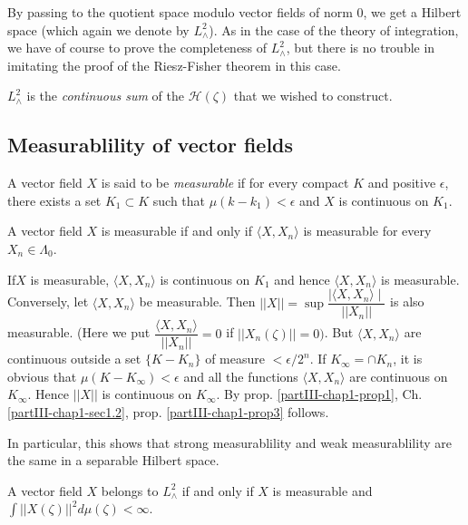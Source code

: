 By passing to the quotient space modulo vector fields of norm $0$, we
get a Hilbert space (which again we denote by $L^2_\wedge$). As in the
case of the  theory of integration, we have of course to prove the
completeness of $L^2_\wedge$, but there is no trouble in imitating the
proof of the Riesz-Fisher theorem in this case. 

$L^2_\wedge$ is the \textit{continuous sum} of the
$\mathscr{H}(\zeta)$ that we wished to construct. 

\subsection{Measurablility of vector
fields}\label{partIII-chap1-sec1.4} %

\begin{defi*}
A vector field $X$ is said to be {\em measurable} if for every compact
$K$ and positive $\epsilon$, there exists a set $K_1 \subset K$  such
that $\mu(k-k_1)< \epsilon$ and $X$ is continuous on $K_1$. 
\end{defi*} 

\begin{proposition}\label{partIII-chap1-prop3}%
A vector field $X$ is measurable if and only if $\langle X,X_n
  \rangle$ is measurable for every $X_n\in\Lambda_0$. 
\end{proposition}
 
If\pageoriginale $X$ is measurable, $\langle X,X_n \rangle $ is
 continuous on $K_1$ 
 and hence $\langle X,X_n\rangle$ is measurable. Conversely, let
 $\langle X,X_n\rangle $ be measurable. Then $|| X ||=\sup
 \dfrac{\mid\langle X,X_n\rangle\mid}{||  X_n ||}$ is also
 measurable. (Here we put $\dfrac{\langle X,X_n \rangle}{|| X_n ||}=0$
 if $|| X_n(\zeta)||=0)$. But $\langle X,X_n\rangle$ are continuous
 outside a set $\{K-K_n\} $  of measure $< \epsilon/2^n$. If $K_\infty=\cap
 K_n$, it is obvious that  $\mu(K-K_\infty)<\epsilon$ and all the functions
 $\langle X,X_n \rangle$ are continuous on $K_\infty$. Hence $||X||$
 is continuous on $K_\infty$. By prop. \ref{partIII-chap1-prop1},
 Ch. \ref{partIII-chap1-sec1.2}, prop. \ref{partIII-chap1-prop3}
 follows.  

In particular, this shows that strong measurablility and weak
measurablility are the same in a separable Hilbert space. 

\begin{proposition}\label{partIII-chap1-prop4} %
A vector field $X$ belongs to $L^2_\wedge$ if and only if $X$ is
  measurable and $\int || X(\zeta)||^2 d\mu(\zeta)<\infty$. 
 \end{proposition} 
 
